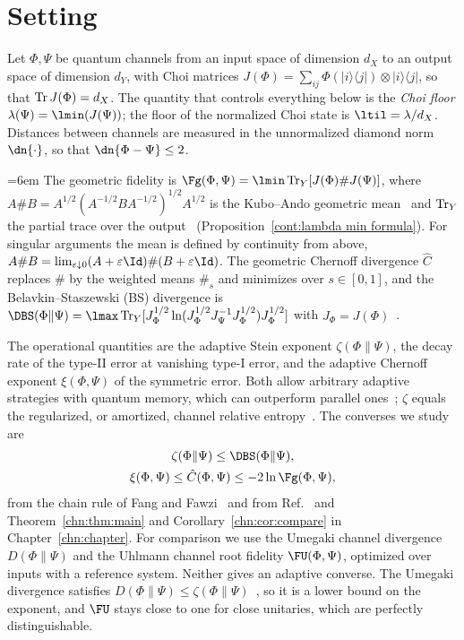 \section{Setting}\label{gate:sec:setting}

Let $\Phi,\Psi$ be quantum channels from an input space of dimension $d_X$ to an output space of dimension $d_Y$, with Choi matrices $J(\Phi)=\sum_{ij}\Phi(|i\rangle\langle j|)\otimes|i\rangle\langle j|$, so that $\operatorname{Tr} J(\Phi)=d_X$. The quantity that controls everything below is the \emph{Choi floor} $\lambda(\Psi)=\lmin(J(\Psi))$; the floor of the normalized Choi state is $\ltil=\lambda/d_X$. Distances between channels are measured in the unnormalized diamond norm $\dn{\cdot}$, so that $\dn{\Phi-\Psi}\le2$.

{\emergencystretch=6em The geometric fidelity is $\Fg(\Phi,\Psi)=\lmin\Tr_Y[J(\Phi)\#J(\Psi)]$, where $A\#B=A^{1/2}(A^{-1/2}BA^{-1/2})^{1/2}A^{1/2}$ is the Kubo--Ando geometric mean~\cite{KuboAndo1980} and $\operatorname{Tr}_Y$ the partial trace over the output~\cite{KatariyaWilde2021} (Proposition~\ref{cont:lambda min formula}). For singular arguments the mean is defined by continuity from above, $A\#B=\lim_{\varepsilon\downarrow0}(A+\varepsilon\Id)\#(B+\varepsilon\Id)$. The geometric Chernoff divergence $\hat C$ replaces $\#$ by the weighted means $\#_s$ and minimizes over $s\in[0,1]$, and the Belavkin--Staszewski (BS) divergence is $\DBS(\Phi\|\Psi)=\lmax\Tr_Y[J_\Phi^{1/2}\ln(J_\Phi^{1/2}J_\Psi^{-1}J_\Phi^{1/2})J_\Phi^{1/2}]$ with $J_\Phi=J(\Phi)$~\cite{BelavkinStaszewski1982,FangFawzi2021}.\par} The operational quantities are the adaptive Stein exponent $\zeta(\Phi\|\Psi)$, the decay rate of the type-II error at vanishing type-I error, and the adaptive Chernoff exponent $\xi(\Phi,\Psi)$ of the symmetric error. Both allow arbitrary adaptive strategies with quantum memory, which can outperform parallel ones~\cite{HHLW2010,SalekHayashiWinter2022}; $\zeta$ equals the regularized, or amortized, channel relative entropy~\cite{WangWilde2019,WBHK2020,FFRS2020}. The converses we study are
\begin{gather}
\zeta(\Phi\|\Psi)\le\DBS(\Phi\|\Psi),\label{gate:eq:converses}\\
\xi(\Phi,\Psi)\le\hat C(\Phi,\Psi)\le-2\ln\Fg(\Phi,\Psi),\label{gate:eq:converses2}
\end{gather}
from the chain rule of Fang and Fawzi~\cite{FangFawzi2021} and from Ref.~\cite{KatariyaWilde2021} and Theorem~\ref{chn:thm:main} and Corollary~\ref{chn:cor:compare} in Chapter~\ref{chn:chapter}. For comparison we use the Umegaki channel divergence $D(\Phi\|\Psi)$ and the Uhlmann channel root fidelity $\FU(\Phi,\Psi)$, optimized over inputs with a reference system. Neither gives an adaptive converse. The Umegaki divergence satisfies $D(\Phi\|\Psi)\le\zeta(\Phi\|\Psi)$~\cite{WangWilde2019,FFRS2020}, so it is a lower bound on the exponent, and $\FU$ stays close to one for close unitaries, which are perfectly distinguishable.

